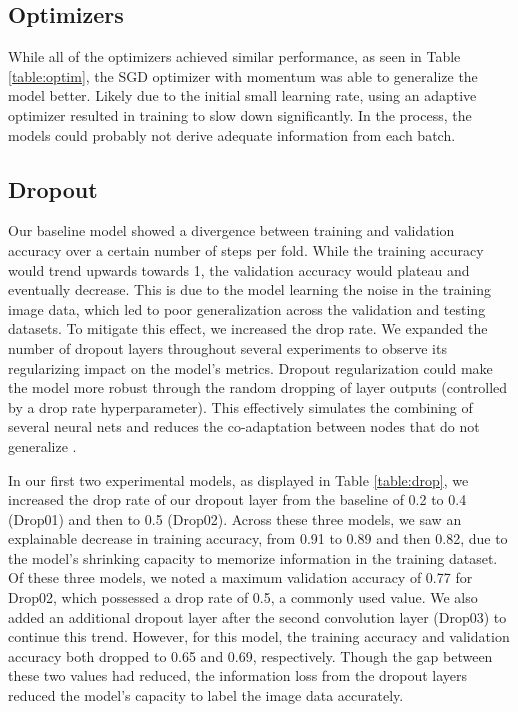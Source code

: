 \documentclass{article}
\begin{document}
\subsection{Optimizers}

While all of the optimizers achieved similar performance, as seen in Table \ref{table:optim}, the SGD optimizer with momentum was able to generalize the model better. Likely due to the initial small learning rate, using an adaptive optimizer resulted in training to slow down significantly. In the process, the models could probably not derive adequate information from each batch.

\subsection{Dropout}

Our baseline model showed a divergence between training and validation accuracy over a certain number of steps per fold. While the training accuracy would trend upwards towards 1, the validation accuracy would plateau and eventually decrease. This is due to the model learning the noise in the training image data, which led to poor generalization across the validation and testing datasets. To mitigate this effect, we increased the drop rate. We expanded the number of dropout layers throughout several experiments to observe its regularizing impact on the model’s metrics. Dropout regularization could make the model more robust through the random dropping of layer outputs (controlled by a drop rate hyperparameter). This effectively simulates the combining of several neural nets and reduces the co-adaptation between nodes that do not generalize \cite{JMLR:v15:srivastava14a}. 

In our first two experimental models, as displayed in Table \ref{table:drop}, we increased the drop rate of our dropout layer from the baseline of 0.2 to 0.4 (Drop01) and then to 0.5 (Drop02). Across these three models, we saw an explainable decrease in training accuracy, from 0.91 to 0.89 and then 0.82, due to the model’s shrinking capacity to memorize information in the training dataset. Of these three models, we noted a maximum validation accuracy of 0.77 for Drop02, which possessed a drop rate of 0.5, a commonly used value. We also added an additional dropout layer after the second convolution layer (Drop03) to continue this trend. However, for this model, the training accuracy and validation accuracy both dropped to 0.65 and 0.69, respectively. Though the gap between these two values had reduced, the information loss from the dropout layers reduced the model’s capacity to label the image data accurately.
\end{document}
